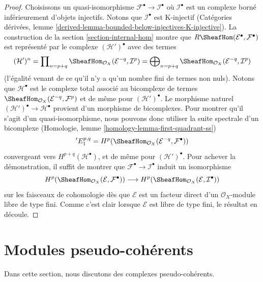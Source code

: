 \begin{proof}

Choisissons un quasi-isomorphisme $\mathcal{F}^\bullet \to \mathcal{I}^\bullet$
où $\mathcal{I}^\bullet$ est un complexe borné inférieurement d'objets injectifs. Notons que $\mathcal{I}^\bullet$ est K-injectif (Catégories dérivées, lemme
\ref{derived-lemma-bounded-below-injectives-K-injective}). La construction de la section \ref{section-internal-hom}
montre que
$R\SheafHom(\mathcal{E}^\bullet, \mathcal{F}^\bullet)$ est représenté par le complexe $(\mathcal{H}')^\bullet$ avec des termes
$$
(\mathcal{H}')^n =
\prod\nolimits_{n = p + q}
\SheafHom_{\mathcal{O}_X}(\mathcal{E}^{-q}, \mathcal{I}^p) =
\bigoplus\nolimits_{n = p + q}
\SheafHom_{\mathcal{O}_X}(\mathcal{E}^{-q}, \mathcal{I}^p)
$$
(l'égalité venant de ce qu'il n'y a qu'un nombre fini de termes non nuls). Notons que $\mathcal{H}^\bullet$ est le complexe total associé au bicomplexe de termes
$\SheafHom_{\mathcal{O}_X}(\mathcal{E}^{-q}, \mathcal{F}^p)$
et de même pour $(\mathcal{H}')^\bullet$. Le morphisme naturel $(\mathcal{H}')^\bullet \to \mathcal{H}^\bullet$ provient d'un morphisme de bicomplexes.
Pour montrer qu'il s'agit d'un quasi-isomorphisme, nous pouvons donc utiliser la suite spectrale d'un bicomplexe (Homologie, lemme \ref{homology-lemma-first-quadrant-ss})
$$
{}'E_1^{p, q} =
H^p(\SheafHom_{\mathcal{O}_X}(\mathcal{E}^{-q}, \mathcal{F}^\bullet))
$$
convergeant vers $H^{p + q}(\mathcal{H}^\bullet)$, et de même pour
$(\mathcal{H}')^\bullet$. Pour achever la démonstration, il suffit de montrer que $\mathcal{F}^\bullet \to \mathcal{I}^\bullet$
induit un isomorphisme
$$
H^p(\SheafHom_{\mathcal{O}_X}(\mathcal{E}, \mathcal{F}^\bullet))
\longrightarrow
H^p(\SheafHom_{\mathcal{O}_X}(\mathcal{E}, \mathcal{I}^\bullet))
$$
sur les faisceaux de cohomologie dès que $\mathcal{E}$ est un facteur direct d'un $\mathcal{O}_X$-module libre de type fini. Comme c'est clair lorsque $\mathcal{E}$
est libre de type fini, le résultat en découle.

\end{proof}





\section{Modules pseudo-cohérents}

\label{section-pseudo-coherent}

\noindent
Dans cette section, nous discutons des complexes pseudo-cohérents.

